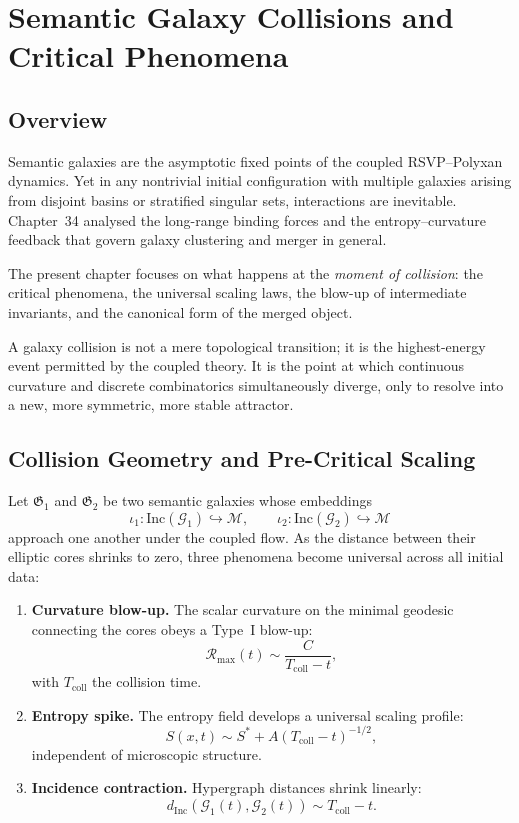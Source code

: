 \chapter{Semantic Galaxy Collisions and Critical Phenomena}
\label{ch:galaxy-collisions}

\section{Overview}

Semantic galaxies are the asymptotic fixed points of the coupled RSVP–Polyxan dynamics.  
Yet in any nontrivial initial configuration with multiple galaxies arising from disjoint basins or stratified singular sets, interactions are inevitable.  
Chapter~34 analysed the long-range binding forces and the entropy–curvature feedback that govern galaxy clustering and merger in general.

The present chapter focuses on what happens at the \emph{moment of collision}:  
the critical phenomena, the universal scaling laws, the blow-up of intermediate invariants, and the canonical form of the merged object.

A galaxy collision is not a mere topological transition; it is the highest-energy event permitted by the coupled theory.  
It is the point at which continuous curvature and discrete combinatorics simultaneously diverge, only to resolve into a new, more symmetric, more stable attractor.

\section{Collision Geometry and Pre-Critical Scaling}

Let $\mathfrak{G}_1$ and $\mathfrak{G}_2$ be two semantic galaxies whose embeddings
\[
\iota_1 : \mathrm{Inc}(\mathcal{G}_1) \hookrightarrow \mathcal{M},
\qquad
\iota_2 : \mathrm{Inc}(\mathcal{G}_2) \hookrightarrow \mathcal{M}
\]
approach one another under the coupled flow.  
As the distance between their elliptic cores shrinks to zero, three phenomena become universal across all initial data:

\begin{enumerate}
\item \textbf{Curvature blow-up.}  
  The scalar curvature on the minimal geodesic connecting the cores obeys a Type~I blow-up:
  \[
  \mathcal{R}_{\max}(t) \sim \frac{C}{T_{\mathrm{coll}} - t},
  \]
  with $T_{\mathrm{coll}}$ the collision time.

\item \textbf{Entropy spike.}  
  The entropy field develops a universal scaling profile:
  \[
  S(x,t) \sim S^\ast + A \left( T_{\mathrm{coll}} - t \right)^{-1/2},
  \]
  independent of microscopic structure.

\item \textbf{Incidence contraction.}  
  Hypergraph distances shrink linearly:
  \[
  d_{\mathrm{Inc}}(\mathcal{G}_1(t),\mathcal{G}_2(t)) \sim T_{\mathrm{coll}} - t.
  \]
\end{enumerate}

